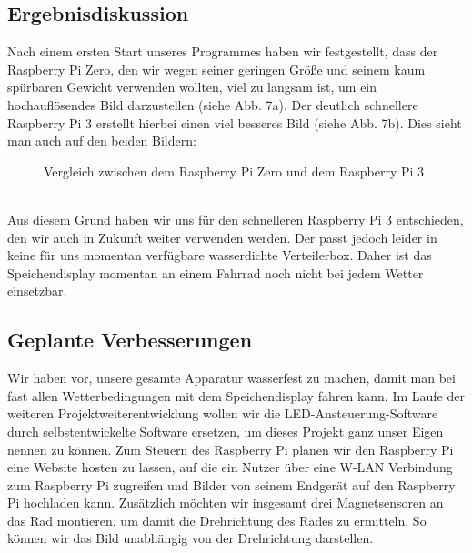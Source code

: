 \documentclass [a4paper, 11pt] {article}
\begin{document}
\subsection{Ergebnisdiskussion}
Nach einem ersten Start unseres Programmes haben wir festgestellt, dass der Raspberry Pi Zero, den wir wegen seiner geringen Größe und seinem kaum spürbaren Gewicht verwenden wollten, viel zu langsam ist, um ein hochauflösendes Bild darzustellen (siehe Abb. 7a). Der deutlich schnellere Raspberry Pi 3 erstellt hierbei einen viel besseres Bild (siehe Abb. 7b). Dies sieht man auch auf den beiden Bildern:
\begin{figure}[h]
\centering
{} 
\caption{Vergleich zwischen dem Raspberry Pi Zero und dem Raspberry Pi 3}
\end{figure}
\\Aus diesem Grund haben wir uns für den schnelleren Raspberry Pi 3 entschieden, den wir auch in Zukunft weiter verwenden werden. Der passt jedoch leider in keine für uns momentan verfügbare wasserdichte Verteilerbox. Daher ist das Speichendisplay momentan an einem Fahrrad noch nicht bei jedem Wetter einsetzbar.
\subsection{Geplante Verbesserungen}
Wir haben vor, unsere gesamte Apparatur wasserfest zu machen, damit man bei fast allen Wetterbedingungen mit dem Speichendisplay fahren kann. Im Laufe der weiteren Projektweiterentwicklung wollen wir die LED-Ansteuerung-Software durch selbstentwickelte Software ersetzen, um dieses Projekt ganz unser Eigen nennen zu können. Zum Steuern des Raspberry Pi planen wir den Raspberry Pi eine Website hosten zu lassen, auf die ein Nutzer über eine W-LAN Verbindung zum Raspberry Pi zugreifen und Bilder von seinem Endgerät auf den Raspberry Pi hochladen kann. Zusätzlich möchten wir insgesamt drei Magnetsensoren an das Rad montieren, um damit die Drehrichtung des Rades zu ermitteln. So können wir das Bild unabhängig von der Drehrichtung darstellen.
\end{document}
